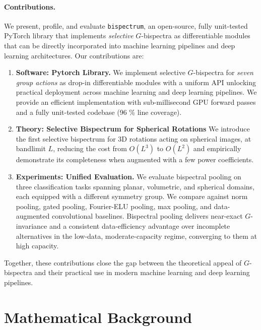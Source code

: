 \documentclass{article}
\theoremstyle{definition}
\theoremstyle{remark}
\theoremstyle{definition}
\begin{document}
\paragraph{Contributions.} We present, profile, and evaluate \texttt{bispectrum}, an open-source, fully unit-tested
PyTorch library that implements \emph{selective} $G$-bispectra as differentiable modules that can be directly incorporated into machine learning pipelines and deep learning architectures. Our contributions are:
\begin{enumerate}[leftmargin=*]
  \item \textbf{Software: Pytorch Library.} We implement selective
    $G$-bispectra for \emph{seven group actions} as drop-in differentiable modules with a
    uniform API unlocking practical deployment across machine learning and deep learning pipelines. We provide an efficient implementation with sub-millisecond GPU forward passes  and a fully unit-tested codebase (96 \% line coverage).
  \item \textbf{Theory: Selective Bispectrum for Spherical Rotations}
    We introduce the first selective bispectrum for 3D rotations acting on spherical images, at bandlimit $L$, reducing the cost from $O(L^3)$ to $O(L^2)$ and empirically demonstrate its completeness when augmented with a few power coefficients.
 \item \textbf{Experiments: Unified Evaluation.} We evaluate bispectral
  pooling on three classification tasks spanning planar, volumetric, and
  spherical domains, each equipped with a different symmetry group. We
  compare against norm pooling, gated pooling, Fourier-ELU pooling, max
  pooling, and data-augmented convolutional baselines. Bispectral pooling delivers
  near-exact $G$-invariance and a consistent data-efficiency
  advantage over incomplete alternatives in the low-data,
  moderate-capacity regime, converging to them at high capacity.
\end{enumerate}

Together, these contributions close the gap between the theoretical appeal of $G$-bispectra and their practical use in modern machine learning and deep learning pipelines.

\section{Mathematical Background}
\label{sec:background}
\end{document}
